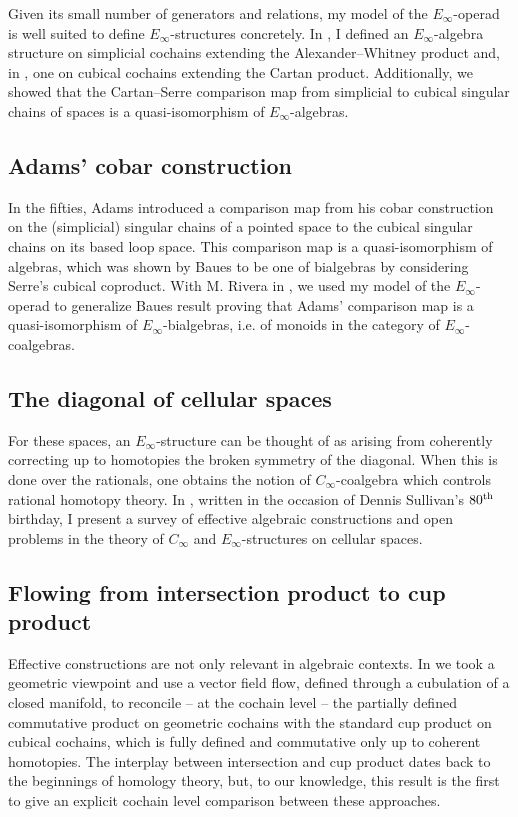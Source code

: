 Given its small number of generators and relations, my model of the $E_\infty$-operad is well suited to define $E_{\infty}$-structures concretely.
In \cite{medina2020prop1}, I defined an $E_\infty$-algebra structure on simplicial cochains extending the Alexander--Whitney product and, in \cite{medina2022cube_einfty}, one on cubical cochains extending the Cartan product.
Additionally, we showed that the Cartan--Serre comparison map from simplicial to cubical singular chains of spaces is a quasi-isomorphism of $E_\infty$-algebras.

\subsection{Adams' cobar construction}

In the fifties, Adams introduced a comparison map from his cobar construction on the (simplicial) singular chains of a pointed space to the cubical singular chains on its based loop space.
This comparison map is a quasi-isomorphism of algebras, which was shown by Baues to be one of bialgebras by considering Serre's cubical coproduct.
With M. Rivera in \cite{medina2021cobar}, we used my model of the $E_\infty$-operad to generalize Baues result proving that Adams' comparison map is a quasi-isomorphism of $E_{\infty}$-bialgebras, i.e. of monoids in the category of $E_{\infty}$-coalgebras.

\subsection{The diagonal of cellular spaces}

For these spaces, an $E_\infty$-structure can be thought of as arising from coherently correcting up to homotopies the broken symmetry of the diagonal.
When this is done over the rationals, one obtains the notion of $C_\infty$-coalgebra which controls rational homotopy theory.
In \cite{medina2022dennis}, written in the occasion of Dennis Sullivan's $80^{\mathrm{th}}$ birthday, I present a survey of effective algebraic constructions and open problems in the theory of $C_\infty$ and $E_\infty$-structures on cellular spaces.

\subsection{Flowing from intersection product to cup product} \label{ss:flowing}

Effective constructions are not only relevant in algebraic contexts.
In \cite{medina2021flowing} we took a geometric viewpoint and use a vector field flow, defined through a cubulation of a closed manifold, to reconcile -- at the cochain level -- the partially defined commutative product on geometric cochains with the standard cup product on cubical cochains, which is fully defined and commutative only up to coherent homotopies. The interplay between intersection and cup product dates back to the beginnings of homology theory, but, to our knowledge, this result is the first to give an explicit cochain level comparison between these approaches.

